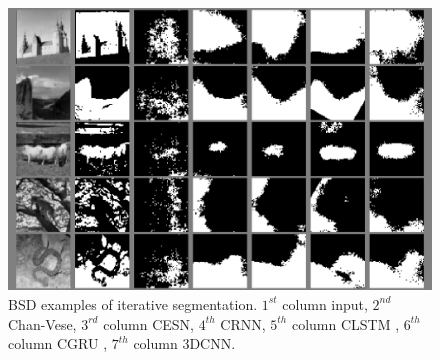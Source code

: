 \documentclass{WitsPhysicsReport}
\begin{document}
\begin{figure}[H]
\centering
  \includegraphics[width=1\linewidth]{Figure/Results/BSR_sample.png}
 \caption{BSD examples of iterative segmentation. $1^{st}$ column input, $2^{nd}$ Chan-Vese, $3^{rd}$ column CESN, $4^{th}$ CRNN, $5^{th}$ column CLSTM , $6^{th}$ column CGRU , $7^{th}$ column 3DCNN.}
 \label{fig:sample_results_BSD}
\end{figure}




\end{document}
